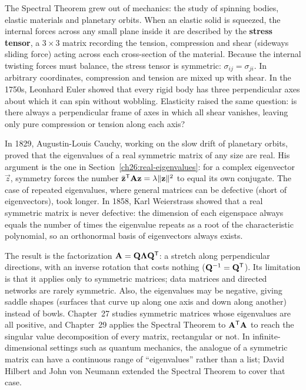 \begin{historybox}
The Spectral Theorem grew out of mechanics: the study of spinning bodies, elastic materials and planetary orbits. When an elastic solid is squeezed, the internal forces across any small plane inside it are described by the \textbf{stress tensor}, a $3\times 3$ matrix recording the tension, compression and shear (sideways sliding force) acting across each cross-section of the material. Because the internal twisting forces must balance, the stress tensor is symmetric: $\sigma_{ij} = \sigma_{ji}$. In arbitrary coordinates, compression and tension are mixed up with shear. In the 1750s, Leonhard Euler showed that every rigid body has three perpendicular axes about which it can spin without wobbling. Elasticity raised the same question: is there always a perpendicular frame of axes in which all shear vanishes, leaving only pure compression or tension along each axis?

In 1829, Augustin-Louis Cauchy, working on the slow drift of planetary orbits, proved that the eigenvalues of a real symmetric matrix of any size are real. His argument is the one in Section~\ref{ch26:real-eigenvalues}: for a complex eigenvector $\vec{z}$, symmetry forces the number $\bar{\mathbf{z}}^{\mathsf{T}}\mathbf{A}\mathbf{z} = \lambda \lVert\mathbf{z}\rVert^2$ to equal its own conjugate. The case of repeated eigenvalues, where general matrices can be defective (short of eigenvectors), took longer. In 1858, Karl Weierstrass showed that a real symmetric matrix is never defective: the dimension of each eigenspace always equals the number of times the eigenvalue repeats as a root of the characteristic polynomial, so an orthonormal basis of eigenvectors always exists.

The result is the factorization $\mathbf{A} = \mathbf{Q}\mathbf{\Lambda}\mathbf{Q}^{\mathsf{T}}$: a stretch along perpendicular directions, with an inverse rotation that costs nothing ($\mathbf{Q}^{-1} = \mathbf{Q}^{\mathsf{T}}$). Its limitation is that it applies only to symmetric matrices; data matrices and directed networks are rarely symmetric. Also, the eigenvalues may be negative, giving saddle shapes (surfaces that curve up along one axis and down along another) instead of bowls. Chapter~27 studies symmetric matrices whose eigenvalues are all positive, and Chapter~29 applies the Spectral Theorem to $\mathbf{A}^{\mathsf{T}}\mathbf{A}$ to reach the singular value decomposition of every matrix, rectangular or not. In infinite-dimensional settings such as quantum mechanics, the analogue of a symmetric matrix can have a continuous range of ``eigenvalues'' rather than a list; David Hilbert and John von Neumann extended the Spectral Theorem to cover that case.
\end{historybox}


